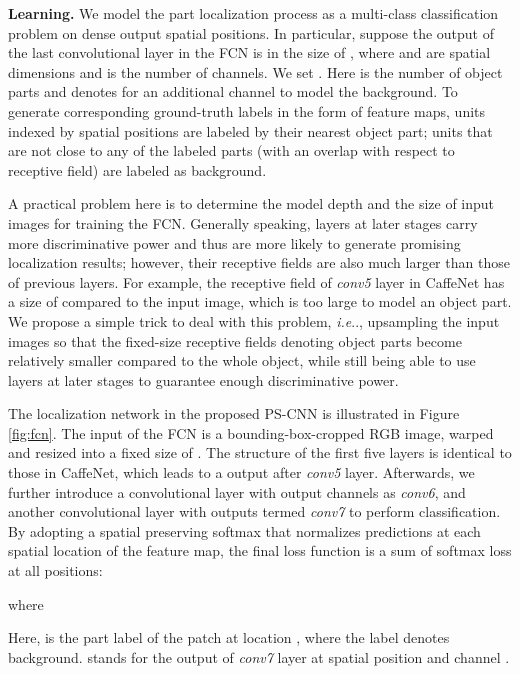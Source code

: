 \documentclass[10pt,twocolumn,letterpaper]{article}
\makeatletter
\DeclareRobustCommand\onedot{\futurelet\@let@token\@onedot}
\def\@onedot{\ifx\@let@token.\else.\null\fi\xspace}
\def\ie{\emph{i.e}\onedot} \def\Ie{\emph{I.e}\onedot}
\makeatother
\begin{document}
\noindent\textbf{Learning.} We model the part localization process as a multi-class classification problem on dense output spatial positions. In particular, suppose the output of the last convolutional layer in the FCN is in the size of , where  and  are spatial dimensions and  is the number of channels. We set . Here  is the number of object parts and  denotes for an additional channel to model the background. To generate corresponding ground-truth labels in the form of feature maps, units indexed by  spatial positions are labeled by their nearest object part; units that are not close to any of the labeled parts (with an overlap  with respect to receptive field) are labeled as background.



A practical problem here is to determine the model depth and the size of input images for training the FCN. Generally speaking, layers at later stages carry more discriminative power and thus are more likely to generate promising localization results; however, their receptive fields are also much larger than those of previous layers. For example, the receptive field of \textit{conv5} layer in CaffeNet has a size of  compared to the  input image, which is too large to model an object part. We propose a simple trick to deal with this problem, \ie, upsampling the input images so that the fixed-size receptive fields denoting object parts become relatively smaller compared to the whole object, while still being able to use layers at later stages to guarantee enough discriminative power.







The localization network in the proposed PS-CNN is illustrated in Figure \ref{fig:fcn}. The input of the FCN is a bounding-box-cropped RGB image, warped and resized into a fixed size of . The structure of the first five layers is identical to those in CaffeNet, which leads to a  output after \textit{conv5} layer. Afterwards, we further introduce a  convolutional layer with  output channels as \textit{conv6}, and another  convolutional layer with  outputs termed \textit{conv7} to perform classification. By adopting a spatial preserving softmax that normalizes predictions at each spatial location of the feature map, the final loss function is a sum of softmax loss at all  positions:


where

Here,  is the part label of the patch at location , where the label  denotes background.  stands for the output of \textit{conv7} layer at spatial position  and channel .
\\
\end{document}
